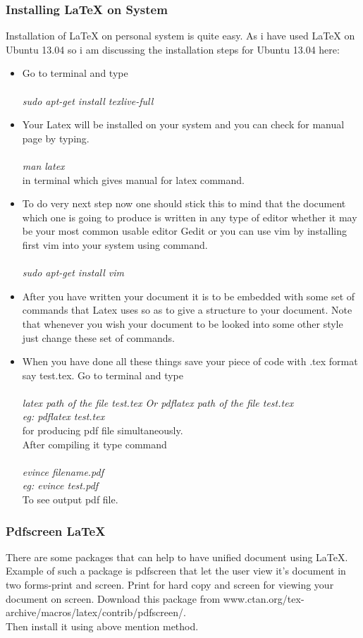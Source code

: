 \subsubsection{Installing \LaTeX{} on System}
Installation of \LaTeX{} on personal system is quite easy. As i have used \LaTeX{} on Ubuntu 13.04 so i am discussing the installation steps for Ubuntu 13.04 here:
\begin{itemize}
\item Go to terminal and type\\\\
\textit{sudo apt-get install texlive-full}
\item Your Latex will be installed on your system and you can check for manual page by typing.\\\\
\textit{man latex}\\

in terminal which gives manual for latex command.
\item To do very next step now one should stick this to mind that the document which one is going to produce is written in any type of editor whether it may be your most common usable editor Gedit or you can use vim by installing first vim into your system using command.\\\\
\textit{sudo apt-get install vim}
\item After you have written your document it is to be embedded with some set of commands that Latex uses so as to give a structure to your document. Note that whenever you wish your document to be looked into some other style just change these set of commands.
\item When you have done all these things save your piece of code with .tex format say test.tex. Go to terminal and type\\\\
\textit{latex path of the file test.tex Or pdflatex path of the file test.tex\\ eg: pdflatex test.tex}\\
for producing pdf file simultaneously.\\
After compiling it type command\\\\
\textit{evince filename.pdf\\ eg: evince test.pdf}\\
To see output pdf file. 
\end{itemize}
\subsubsection{Pdfscreen \LaTeX{}}
There are some packages that can help to have unified document using \LaTeX{}. Example of such a package is pdfscreen that let the user view it’s document in two forms-print and screen. Print for hard copy and screen for viewing your document on screen. Download this package from www.ctan.org/tex-archive/macros/latex/contrib/pdfscreen/.\\
Then install it using above mention method.\\

